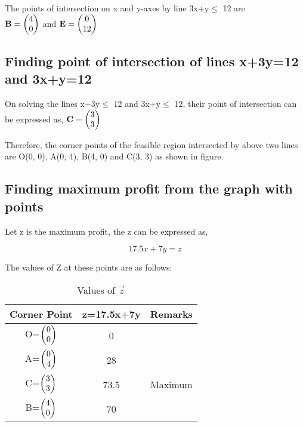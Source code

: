\documentclass[journal,10pt,twocolumn]{article}
\begin{document}
The points of intersection on x and y-axes by line 3x+y$\le$ 12 are\\
\center
$\mathbf{B} =\begin{pmatrix}4\\0\end{pmatrix}$  and $\mathbf{E} =\begin{pmatrix}0\\12\end{pmatrix}$ \\
\endcenter
\begin{flushleft}
\subsection{Finding point of intersection of lines x+3y=12 and 3x+y=12}
\end{flushleft}
On solving the lines x+3y$\le$ 12 and 3x+y$\le$ 12, their point of intersection can be expressed as,
\center
$ \mathbf{C}=\begin{pmatrix}3\\3\end{pmatrix}$
\endcenter
\begin{flushleft}
Therefore, the corner points of the feasible region intersected by above two lines are O(0, 0), A(0, 4), B(4, 0) and C(3, 3) as shown in figure.
\end{flushleft}
\begin{flushleft}
\subsection{Finding maximum profit from the graph with points}
Let z is the maximum profit, the z can be expressed as,
\end{flushleft}
\begin{equation}
17.5x+7y=z
\end{equation}
\begin{flushleft}
The values of Z at these points are as follows:\\
\end{flushleft}
\vspace{0.25cm}

\setlength\extrarowheight{2pt}
\begin{table}
\begin{tabular}{|c|c|c|} \hline
	\textbf{Corner Point} & \textbf{z=17.5x+7y} &\textbf{Remarks}\\
	\hline
	O=$\begin{pmatrix}0\\0\end{pmatrix}$ & 0 & \\  \hline
	A=$\begin{pmatrix}0\\4\end{pmatrix}$ & 28 & \\ \hline
	C=$\begin{pmatrix}3\\3\end{pmatrix}$ & 73.5 & Maximum\\ \hline
	B=$\begin{pmatrix}4\\0\end{pmatrix}$ & 70 &  \\ \hline
\end{tabular}
\caption{\label{tab:widgets}Values of $\vec{z}$ }
\end{table}
\end{document}
